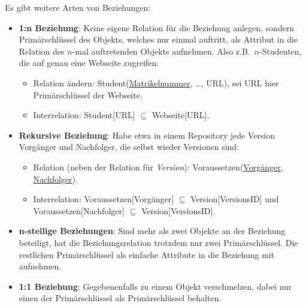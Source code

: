 \documentclass[a4paper,parskip=half*,DIV=15,fontsize=11pt]{scrartcl}
\begin{document}
Es gibt weitere Arten von Beziehungen:
\begin{itemize}
  \item \textbf{1:n Beziehung}: Keine eigene Relation für die Beziehung anlegen, sondern Primärschlüssel des Objekts, welches nur einmal auftritt, als Attribut in die Relation des $n$-mal auftretenden Objekts aufnehmen. Also z.B.\ $n$-Studenten, die auf genau eine Webseite zugreifen:
    \begin{itemize}
      \item Relation ändern: Student(\underline{Matrikelnummer}, \ldots, URL), sei URL hier Primärschlüssel der Webseite.
      \item Interrelation: Student[URL] $\subseteq$ Webseite[URL].
    \end{itemize}
  \item \textbf{Rekursive Beziehung}: Habe etwa in einem Repository jede Version Vorgänger und Nachfolger, die selbst wieder Versionen sind:
    \begin{itemize}
      \item Relation (neben der Relation für \emph{Version}): Voraussetzen(\underline{Vorgänger}, \underline{Nachfolger}).
      \item Interrelation: Voraussetzen[Vorgänger] $\subseteq$ Version[VersionsID] und Voraussetzen[Nachfolger] $\subseteq$ Version[VersionsID].
    \end{itemize}
  \item \textbf{n-stellige Beziehungen}: Sind mehr als zwei Objekte an der Beziehung beteiligt, hat die Beziehungsrelation trotzdem nur zwei Primärschlüssel. Die restlichen Primärschlüssel als einfache Attribute in die Beziehung mit aufnehmen.
  \item \textbf{1:1 Beziehung}: Gegebenenfalls zu einem Objekt verschmelzen, dabei nur einen der Primärschlüssel als Primärschlüssel behalten.
\end{itemize}
\end{document}
